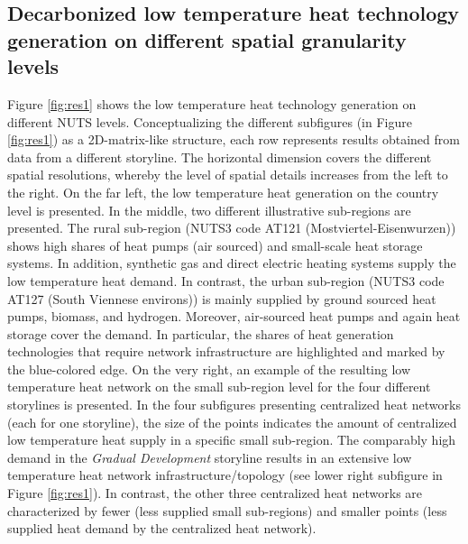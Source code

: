 \subsection{Decarbonized low temperature heat technology generation on different spatial granularity levels}\label{res:2}
Figure \ref{fig:res1} shows the low temperature heat technology generation on different NUTS levels. Conceptualizing the different subfigures (in Figure \ref{fig:res1}) as a 2D-matrix-like structure, each row represents results obtained from data from a different storyline. The horizontal dimension covers the different spatial resolutions, whereby the level of spatial details increases from the left to the right. On the far left, the low temperature heat generation on the country level is presented. In the middle, two different illustrative sub-regions are presented. The rural sub-region (NUTS3 code AT121 (Mostviertel-Eisenwurzen)) shows high shares of heat pumps (air sourced) and small-scale heat storage systems. In addition, synthetic gas and direct electric heating systems supply the low temperature heat demand. In contrast, the urban sub-region (NUTS3 code AT127 (South Viennese environs)) is mainly supplied by ground sourced heat pumps, biomass, and hydrogen. Moreover, air-sourced heat pumps and again heat storage cover the demand. In particular, the shares of heat generation technologies that require network infrastructure are highlighted and marked by the blue-colored edge. On the very right, an example of the resulting low temperature heat network on the small sub-region level for the four different storylines is presented. In the four subfigures presenting centralized heat networks (each for one storyline), the size of the points indicates the amount of centralized low temperature heat supply in a specific small sub-region. The comparably high demand in the \textit{Gradual Development} storyline results in an extensive low temperature heat network infrastructure/topology (see lower right subfigure in Figure \ref{fig:res1}). In contrast, the other three centralized heat networks are characterized by fewer (less supplied small sub-regions) and smaller points (less supplied heat demand by the centralized heat network).

